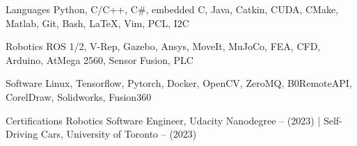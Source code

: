 
\begin{cvskills}

  \cvskill
    { Languages} %
    { Python, C/C++, C\#, embedded C, Java, Catkin, CUDA, CMake, Matlab, Git, Bash, LaTeX, Vim, PCL, I2C}

  \cvskill
    { Robotics} %
    { ROS 1/2, V-Rep, Gazebo, Ansys, MoveIt, MuJoCo, FEA, CFD, Arduino, AtMega 2560, Sensor Fusion, PLC}

  \cvskill
    { Software} %
    { Linux, Tensorflow, Pytorch, Docker, OpenCV, ZeroMQ, B0RemoteAPI, CorelDraw, Solidworks, Fusion360}

  \cvskill
    { Certifications} %
    { Robotics Software Engineer, Udacity Nanodegree -- (2023) | Self-Driving Cars, University of Toronto -- (2023)}


\end{cvskills}
